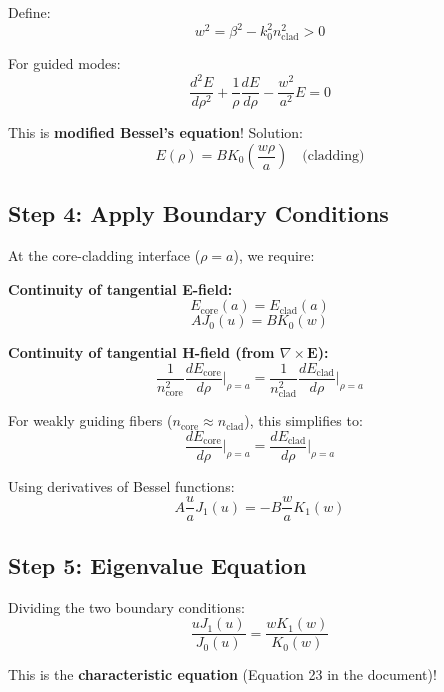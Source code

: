 \documentclass[12pt]{article}
\begin{document}
Define:
$$w^2 = \beta^2 - k_0^2 n_{\text{clad}}^2 > 0$$

For guided modes:
\begin{equation}
\frac{d^2 E}{d\rho^2} + \frac{1}{\rho}\frac{dE}{d\rho} - \frac{w^2}{a^2} E = 0
\end{equation}

This is \textbf{modified Bessel's equation}! Solution:
\begin{equation}
E(\rho) = B K_0\left(\frac{w\rho}{a}\right) \quad \text{(cladding)}
\end{equation}

\subsection{Step 4: Apply Boundary Conditions}

At the core-cladding interface ($\rho = a$), we require:

\textbf{Continuity of tangential E-field:}
\begin{equation}
E_{\text{core}}(a) = E_{\text{clad}}(a)
\end{equation}
$$A J_0(u) = B K_0(w)$$

\textbf{Continuity of tangential H-field (from $\nabla \times \mathbf{E}$):}
\begin{equation}
\frac{1}{n_{\text{core}}^2}\frac{dE_{\text{core}}}{d\rho}\bigg|_{\rho=a} = \frac{1}{n_{\text{clad}}^2}\frac{dE_{\text{clad}}}{d\rho}\bigg|_{\rho=a}
\end{equation}

For weakly guiding fibers ($n_{\text{core}} \approx n_{\text{clad}}$), this simplifies to:
\begin{equation}
\frac{dE_{\text{core}}}{d\rho}\bigg|_{\rho=a} = \frac{dE_{\text{clad}}}{d\rho}\bigg|_{\rho=a}
\end{equation}

Using derivatives of Bessel functions:
$$A \frac{u}{a} J_1(u) = -B \frac{w}{a} K_1(w)$$

\subsection{Step 5: Eigenvalue Equation}

Dividing the two boundary conditions:
\begin{equation}
\boxed{\frac{u J_1(u)}{J_0(u)} = \frac{w K_1(w)}{K_0(w)}}
\end{equation}

This is the \textbf{characteristic equation} (Equation 23 in the document)!
\end{document}
